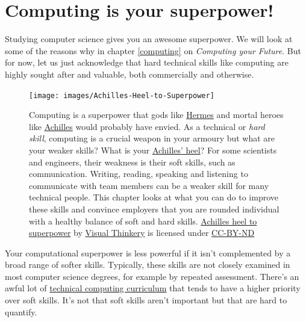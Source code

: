 \documentclass[
]{book}
\begin{document}
\hypertarget{superpower}{%
\section{Computing is your superpower!}\label{superpower}}

Studying computer science gives you an awesome superpower. We will look at some of the reasons why in chapter \ref{computing} on \emph{Computing your Future}. But for now, let us just acknowledge that hard technical skills like computing are highly sought after and valuable, both commercially and otherwise.

\begin{figure}

{\centering \texttt{[image: images/Achilles-Heel-to-Superpower]} 

}

\caption{Computing is a superpower that gods like \href{https://en.wikipedia.org/wiki/Hermes}{Hermes} and mortal heroes like \href{https://en.wikipedia.org/wiki/Achilles}{Achilles} would probably have envied. \citep{heroes, mythos} As a technical or \emph{hard skill}, computing is a crucial weapon in your armoury but what are your weaker skills? What is your \href{https://en.wikipedia.org/wiki/Achilles\%27_heel}{Achilles' heel}? For some scientists and engineers, their weakness is their soft skills, such as communication. Writing, reading, speaking and listening to communicate with team members can be a weaker skill for many technical people. This chapter looks at what you can do to improve these skills and convince employers that you are rounded individual with a healthy balance of soft and hard skills. \href{https://bryanmmathers.com/achilles-heel-to-superpower/}{Achilles heel to superpower} by \href{https://visualthinkery.com}{Visual Thinkery} is licensed under \href{https://creativecommons.org/licenses/by-nd/4.0/}{CC-BY-ND}}\label{fig:achilles-fig}
\end{figure}



Your computational superpower is less powerful if it isn't complemented by a broad range of softer skills. Typically, these skills are not closely examined in most computer science degrees, for example by repeated assessment. There's an awful lot of \href{https://www.acm.org/education/curricula-recommendations}{technical computing curriculum} that tends to have a higher priority over soft skills. It's not that soft skills aren't important but that are hard to quantify.
\end{document}
